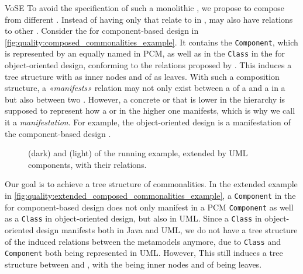 \begin{copiedFrom}{VoSE}
To avoid the specification of such a monolithic \conceptmetamodel, we propose to compose \commonalities from different \conceptmetamodels.
Instead of having only \commonalities that relate to \metaclasses in \concretemetamodels, \commonalities may also have relations to other \commonalities.
Consider the \conceptmetamodel for component-based design in \autoref{fig:quality:composed_commonalities_example}.
It contains the \commonality \texttt{Component}, which is represented by an equally named \metaclass in \gls{PCM},
as well as in the \commonality \texttt{Class} in the \conceptmetamodel for object-oriented design, conforming to the relations proposed by \textcite{langhammer2015a}.
This induces a tree structure with \commonalities as inner nodes and \metaclasses of \concretemetamodels as leaves.
With such a composition structure, a \emph{«manifests»} relation may not only exist between a %
\commonality of a \conceptmetamodel and a \metaclass in a \concretemetamodel but also between two \commonalities.
However, a concrete or \conceptmetamodel that is lower in the hierarchy is supposed to represent how a \metaclass or \commonality in the higher one manifests, which is why we call it a \emph{manifestation}.
For example, the object-oriented design \conceptmetamodel is a manifestation of the component-based design \conceptmetamodel.

\begin{figure}
    \centering
    
    \caption[Concept metamodels in the running example]{\Conceptmetamodels (dark) and \concretemetamodels (light) of the running example, extended by UML components, with their relations.}
    \label{fig:quality:extended_composed_commonalities_example}
\end{figure}

Our goal is to achieve a tree structure of commonalities. In the extended example in \autoref{fig:quality:extended_composed_commonalities_example}, a \texttt{Component} in the \conceptmetamodel for component-based design does not only manifest in a \gls{PCM} \texttt{Component} as well as a \texttt{Class} in object-oriented design, but also in \gls{UML}.
Since a \texttt{Class} in object-oriented design manifests both in Java and \gls{UML}, we do not have a tree structure of the induced relations between the metamodels anymore, due to \texttt{Class} and \texttt{Component} both being represented in \gls{UML}.
However, This still induces a tree structure between \metaclasses and \commonalities, with the \commonalities being inner nodes and \metaclasses of \concretemetamodels being leaves.


\end{copiedFrom}
